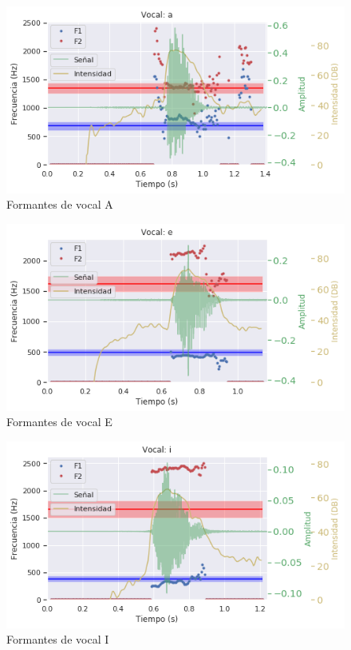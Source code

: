 

\begin{figure}[H]
\caption{Formantes de vocal A}
\label{img:formantes_a}
\includegraphics[width=\textwidth]{imagenes/04_02_a.png}
\end{figure}

\begin{figure}[H]
\caption{Formantes de vocal E}
\label{img:formantes_e}
\includegraphics[width=\textwidth]{imagenes/04_02_e.png}
\end{figure}

\begin{figure}[H]
\caption{Formantes de vocal I}
\label{img:formantes_i}
\includegraphics[width=\textwidth]{imagenes/04_02_i.png}
\end{figure}


